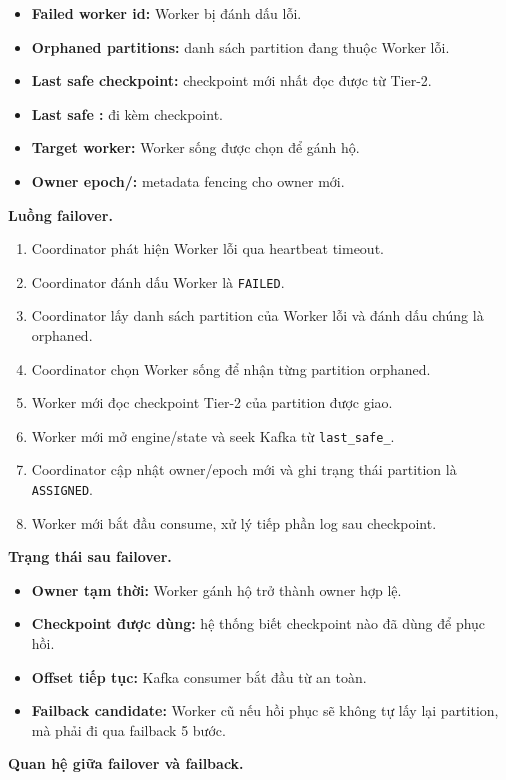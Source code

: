 \documentclass[12pt,a4paper]{article}
\begin{document}
\begin{itemize}
\item \textbf{Failed worker id:} Worker bị đánh dấu lỗi.
\item \textbf{Orphaned partitions:} danh sách partition đang thuộc Worker lỗi.
\item \textbf{Last safe checkpoint:} checkpoint mới nhất đọc được từ Tier-2.
\item \textbf{Last safe :}  đi kèm checkpoint.
\item \textbf{Target worker:} Worker sống được chọn để gánh hộ.
\item \textbf{Owner epoch/:} metadata fencing cho owner mới.
\end{itemize}
\textbf{Luồng failover.}

\begin{enumerate}
\item Coordinator phát hiện Worker lỗi qua heartbeat timeout.
\item Coordinator đánh dấu Worker là \texttt{FAILED}.
\item Coordinator lấy danh sách partition của Worker lỗi và đánh dấu chúng là orphaned.
\item Coordinator chọn Worker sống để nhận từng partition orphaned.
\item Worker mới đọc checkpoint Tier-2 của partition được giao.
\item Worker mới mở engine/state và seek Kafka từ \texttt{last\_safe\_}.
\item Coordinator cập nhật owner/epoch mới và ghi trạng thái partition là \texttt{ASSIGNED}.
\item Worker mới bắt đầu consume, xử lý tiếp phần log sau checkpoint.
\end{enumerate}
\textbf{Trạng thái sau failover.}

\begin{itemize}
\item \textbf{Owner tạm thời:} Worker gánh hộ trở thành owner hợp lệ.
\item \textbf{Checkpoint được dùng:} hệ thống biết checkpoint nào đã dùng để phục hồi.
\item \textbf{Offset tiếp tục:} Kafka consumer bắt đầu từ  an toàn.
\item \textbf{Failback candidate:} Worker cũ nếu hồi phục sẽ không tự lấy lại partition, mà phải đi qua failback 5 bước.
\end{itemize}
\textbf{Quan hệ giữa failover và failback.}
\end{document}
